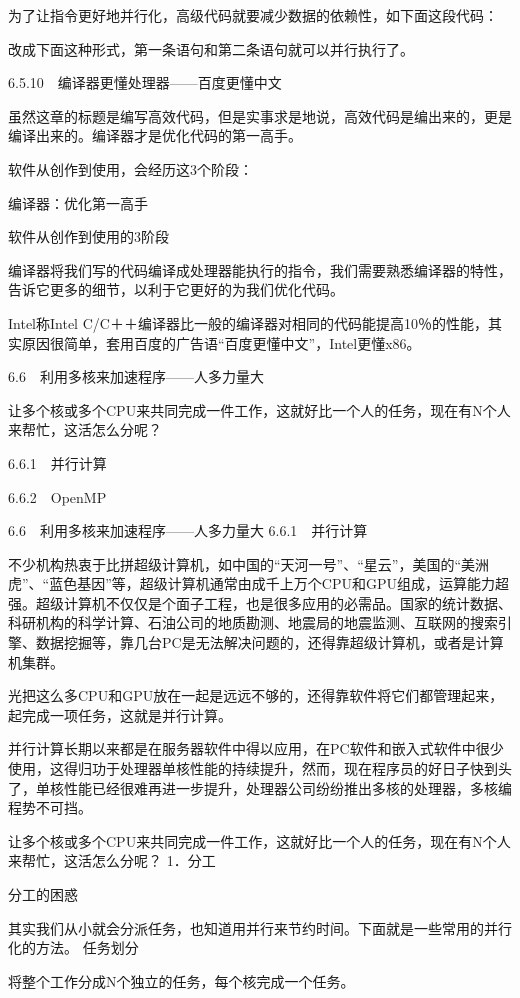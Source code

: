 \documentclass[12pt,UTF8]{ctexbook}
\begin{document}
为了让指令更好地并行化，高级代码就要减少数据的依赖性，如下面这段代码：

改成下面这种形式，第一条语句和第二条语句就可以并行执行了。

6.5.10　编译器更懂处理器——百度更懂中文

虽然这章的标题是编写高效代码，但是实事求是地说，高效代码是编出来的，更是编译出来的。编译器才是优化代码的第一高手。

软件从创作到使用，会经历这3个阶段：

编译器：优化第一高手

软件从创作到使用的3阶段

编译器将我们写的代码编译成处理器能执行的指令，我们需要熟悉编译器的特性，告诉它更多的细节，以利于它更好的为我们优化代码。

Intel称Intel C/C＋＋编译器比一般的编译器对相同的代码能提高10％的性能，其实原因很简单，套用百度的广告语“百度更懂中文”，Intel更懂x86。


6.6　利用多核来加速程序——人多力量大

让多个核或多个CPU来共同完成一件工作，这就好比一个人的任务，现在有N个人来帮忙，这活怎么分呢？

6.6.1　并行计算

6.6.2　OpenMP


6.6　利用多核来加速程序——人多力量大
6.6.1　并行计算

不少机构热衷于比拼超级计算机，如中国的“天河一号”、“星云”，美国的“美洲虎”、“蓝色基因”等，超级计算机通常由成千上万个CPU和GPU组成，运算能力超强。超级计算机不仅仅是个面子工程，也是很多应用的必需品。国家的统计数据、科研机构的科学计算、石油公司的地质勘测、地震局的地震监测、互联网的搜索引擎、数据挖掘等，靠几台PC是无法解决问题的，还得靠超级计算机，或者是计算机集群。

光把这么多CPU和GPU放在一起是远远不够的，还得靠软件将它们都管理起来，起完成一项任务，这就是并行计算。

并行计算长期以来都是在服务器软件中得以应用，在PC软件和嵌入式软件中很少使用，这得归功于处理器单核性能的持续提升，然而，现在程序员的好日子快到头了，单核性能已经很难再进一步提升，处理器公司纷纷推出多核的处理器，多核编程势不可挡。

让多个核或多个CPU来共同完成一件工作，这就好比一个人的任务，现在有N个人来帮忙，这活怎么分呢？
1．分工

分工的困惑

其实我们从小就会分派任务，也知道用并行来节约时间。下面就是一些常用的并行化的方法。
任务划分

将整个工作分成N个独立的任务，每个核完成一个任务。
\end{document}
